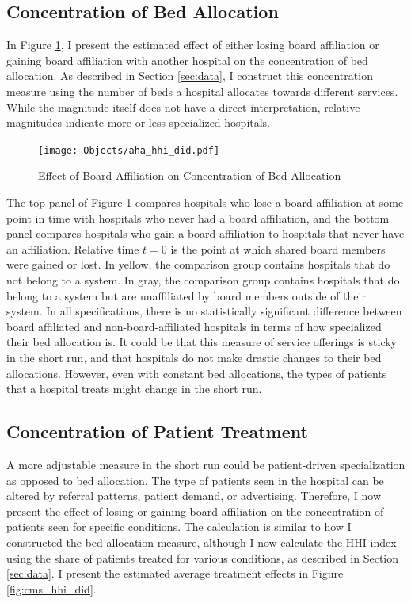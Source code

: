 \documentclass[12pt]{article}
\begin{document}
    \subsection{Concentration of Bed Allocation}

    In Figure \ref{fig:aha_hhi_did}, I present the estimated effect of either losing board affiliation or gaining board affiliation with another hospital on the concentration of bed allocation. As described in Section \ref{sec:data}, I construct this concentration measure using the number of beds a hospital allocates towards different services. While the magnitude itself does not have a direct interpretation, relative magnitudes indicate more or less specialized hospitals. 

    \begin{figure}[ht!]
        \centering
        \caption{Effect of Board Affiliation on Concentration of Bed Allocation}
        \texttt{[image: Objects/aha\_hhi\_did.pdf]}
        \label{fig:aha_hhi_did}
    \end{figure}

    The top panel of Figure \ref{fig:aha_hhi_did} compares hospitals who lose a board affiliation at some point in time with hospitals who never had a board affiliation, and the bottom panel compares hospitals who gain a board affiliation to hospitals that never have an affiliation. Relative time $t=0$ is the point at which shared board members were gained or lost. In yellow, the comparison group contains hospitals that do not belong to a system. In gray, the comparison group contains hospitals that do belong to a system but are unaffiliated by board members outside of their system. In all specifications, there is no statistically significant difference between board affiliated and non-board-affiliated hospitals in terms of how specialized their bed allocation is. It could be that this measure of service offerings is sticky in the short run, and that hospitals do not make drastic changes to their bed allocations. However, even with constant bed allocations, the types of patients that a hospital treats might change in the short run. 

    \subsection{Concentration of Patient Treatment}

    A more adjustable measure in the short run could be patient-driven specialization as opposed to bed allocation. The type of patients seen in the hospital can be altered by referral patterns, patient demand, or advertising. Therefore, I now present the effect of losing or gaining board affiliation on the concentration of patients seen for specific conditions. The calculation is similar to how I constructed the bed allocation measure, although I now calculate the HHI index using the share of patients treated for various conditions, as described in Section \ref{sec:data}. I present the estimated average treatment effects in Figure \ref{fig:cms_hhi_did}. 
\end{document}
